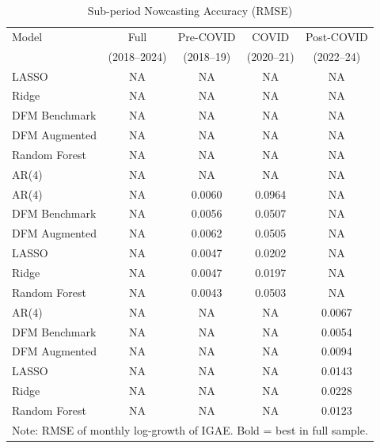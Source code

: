 \begin{table}[htbp]
  \centering
  \caption{Sub-period Nowcasting Accuracy (RMSE)}
  \label{tab:subperiod}
  \begin{tabular}{lcccc}
    \hline\hline
    Model & Full & Pre-COVID & COVID & Post-COVID \\
    & (2018--2024) & (2018--19) & (2020--21) & (2022--24) \\
    \hline
    LASSO & NA & NA & NA & NA \\
    Ridge & NA & NA & NA & NA \\
    DFM Benchmark & NA & NA & NA & NA \\
    DFM Augmented & NA & NA & NA & NA \\
    Random Forest & NA & NA & NA & NA \\
    AR(4) & NA & NA & NA & NA \\
    AR(4) & NA & 0.0060 & 0.0964 & NA \\
    DFM Benchmark & NA & 0.0056 & 0.0507 & NA \\
    DFM Augmented & NA & 0.0062 & 0.0505 & NA \\
    LASSO & NA & 0.0047 & 0.0202 & NA \\
    Ridge & NA & 0.0047 & 0.0197 & NA \\
    Random Forest & NA & 0.0043 & 0.0503 & NA \\
    AR(4) & NA & NA & NA & 0.0067 \\
    DFM Benchmark & NA & NA & NA & 0.0054 \\
    DFM Augmented & NA & NA & NA & 0.0094 \\
    LASSO & NA & NA & NA & 0.0143 \\
    Ridge & NA & NA & NA & 0.0228 \\
    Random Forest & NA & NA & NA & 0.0123 \\
    \hline
    \multicolumn{5}{l}{\footnotesize Note: RMSE of monthly log-growth of IGAE. Bold = best in full sample.} \\
    \hline\hline
  \end{tabular}
\end{table}
